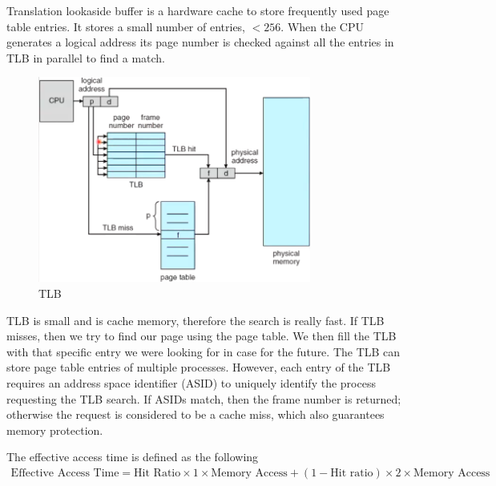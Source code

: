 \documentclass[a4paper]{article}
\theoremstyle{plain}
\theoremstyle{definition}
\newtheorem{defn}{Definition}[section]
\theoremstyle{remark}
\begin{document}
\begin{tcolorbox}[colback=black!3!white,colframe=black!60!white,title=\begin{defn}Translation Lookaside Buffer (TLB) \label{Translation Lookaside Buffer (TLB)}\end{defn}]
Translation lookaside buffer is a hardware cache to store frequently used page table entries. It stores a small number of entries, $<256$. When the CPU generates a logical address its page number is checked against all the entries in TLB in parallel to find a match. 
\begin{figure}[H]
	\centering
	\includegraphics[width=0.8\textwidth]{seventysix.png}
	\caption{TLB}
	\label{fig:seventysix-png}
\end{figure}
TLB is small and is cache memory, therefore the search is really fast. If TLB misses, then we try to find our page using the page table. We then fill the TLB with that specific entry we were looking for in case for the future. The TLB can store page table entries of multiple processes. However, each entry of the TLB requires an address space identifier (ASID) to uniquely identify the process requesting the TLB search. If ASIDs match, then the frame number is returned; otherwise the request is considered to be a cache miss, which also guarantees memory protection. 
\end{tcolorbox}
\begin{tcolorbox}[colback=black!3!white,colframe=black!60!white,title=\begin{defn}Effective Access Time \label{Effective Access Time}\end{defn}]
The effective access time is defined as the following
\begin{align}
\text{Effective Access Time} = \text{Hit Ratio} \times  1 \times \text{Memory Access} + \left( 1-\text{Hit ratio} \right) \times 2\times \text{Memory Access}
\end{align}
\end{tcolorbox}
\end{document}

